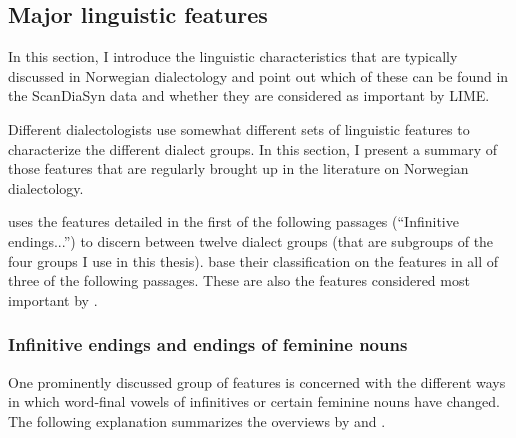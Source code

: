 \subsection{Major linguistic features}
\label{sec:dialects-results-lingmajor}

In this section, I introduce the linguistic characteristics that are typically discussed in Norwegian dialectology and point out which of these can be found in the ScanDiaSyn data and whether they are considered as important by LIME.

Different dialectologists use somewhat different sets of linguistic features to characterize the different dialect groups.
In this section, I present a summary of those features that are regularly brought up in the literature on Norwegian dialectology.

\citet[pp.~113--115]{sandoey1991dialektkunnskap} uses the features detailed in the first of the following passages (``Infinitive endings...'') to discern between twelve dialect groups (that are subgroups of the four groups I use in this thesis).
\citet[pp.~32--42]{maehlum2012dialektlandskapet} base their classification on the features in all of three of the following passages.
These are also the features considered most important by \citet{kaasen2020comparing}.


\subsubsection{Infinitive endings and endings of feminine nouns}
\label{sec:dialects-features-inffem}

One prominently discussed group of features is concerned with the different ways in which word-final vowels of infinitives or certain feminine nouns have changed.
The following explanation summarizes the overviews by 
\citet[pp.~33--35]{maehlum2012dialektlandskapet} and \citet[pp.~113--114]{sandoey1991dialektkunnskap}.

